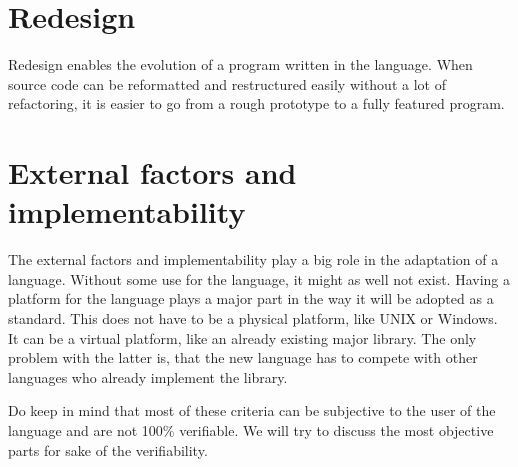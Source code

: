\section{Redesign}
Redesign enables the evolution of a program written in the language.
When source code can be reformatted and restructured easily without a lot of refactoring, it is easier to go from a rough prototype to a fully featured program.

\section{External factors and implementability}
The external factors and implementability play a big role in the adaptation of a language.
Without some use for the language, it might as well not exist.
Having a platform for the language plays a major part in the way it will be adopted as a standard.
This does not have to be a physical platform, like UNIX or Windows.
It can be a virtual platform, like an already existing major library.
The only problem with the latter is, that the new language has to compete with other languages who already implement the library.

\bigskip

Do keep in mind that most of these criteria can be subjective to the user of the language and are not 100\% verifiable.
We will try to discuss the most objective parts for sake of the verifiability.

